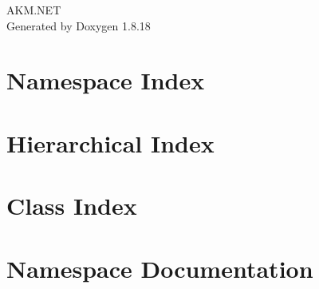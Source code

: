 \let\mypdfximage\pdfximage\def\pdfximage{\immediate\mypdfximage}\documentclass[twoside]{book}
\newcommand{\+}{\discretionary{\mbox{\scriptsize$\hookleftarrow$}}{}{}}
\newcommand{\clearemptydoublepage}{%
  \newpage{\pagestyle{empty}\cleardoublepage}%
}
\begin{document}
\hypersetup{pageanchor=false,
             bookmarksnumbered=true,
             pdfencoding=unicode
            }
\begin{titlepage}
\vspace*{7cm}
\begin{center}%
{\Large A\+K\+M.\+N\+ET }\\
\vspace*{1cm}
{\large Generated by Doxygen 1.8.18}\\
\end{center}
\end{titlepage}
\clearemptydoublepage
{}
\tableofcontents
\clearemptydoublepage
{}
\hypersetup{pageanchor=true}

\chapter{Namespace Index}

\chapter{Hierarchical Index}

\chapter{Class Index}

\chapter{Namespace Documentation}










\end{document}

